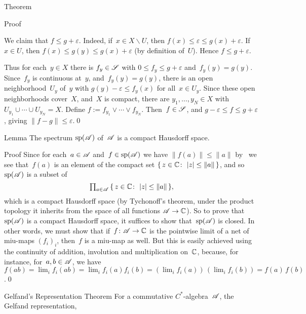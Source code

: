 \documentclass[a]{subfiles}
\begin{document}
\begin{parsec}
\begin{point}{Theorem}
\begin{point}{Proof}
\begin{point}
We claim that $f\leq g+\varepsilon$.
Indeed,
if~$x\in X\backslash U$,
then $f(x)\leq \varepsilon\leq g(x)+\varepsilon$.
If~$x\in U$,
then $f(x)\leq g(y)\leq g(x)+\varepsilon$
(by definition of~$U$).
Hence $f\leq g+\varepsilon$.
\end{point}
\begin{point}%
Thus for each~$y\in X$
there is $f_y\in \mathscr{S}$ with $0\leq f_y \leq g+\varepsilon$
and~$f_y(y)=g(y)$.
Since~$f_y$ is continuous at~$y$,
and~$f_y(y)=g(y)$,
there is an open neighborhood~$U_y$ of~$y$
with $g(y)-\varepsilon\leq f_y(x)$
for all~$x\in U_y$.
Since these open neighborhoods cover~$X$,
and~$X$ is compact,
there are $y_1,\dotsc,y_N\in X$
with $U_{y_1}\cup\dotsb\cup U_{y_N} = X$.
Define $f:=f_{y_1}\vee \dotsb\vee f_{y_N}$.
Then~$f\in\mathscr{S}$,
and $g-\varepsilon \leq f\leq g+\varepsilon$,
giving $\|f-g\|\leq \varepsilon$.\qed
\end{point}
\end{point}
\end{point}
\begin{point}{Lemma}%
The spectrum $\mathrm{sp}(\mathscr{A})$ of~$\mathscr{A}$ is a compact Hausdorff space.
\begin{point}{Proof}%
Since for each~$a\in \mathscr{A}$
and~$f\in \mathrm{sp}(\mathscr{A})$
we have  $\|f(a)\|\leq \|a\|$ 
by~
we see that~$f(a)$ is an element of the compact set
$\{\,z\in \mathbb{C}\colon\, \left|z\right|\leq\|a\|\,\}$,
and so~$\mathrm{sp}(\mathscr{A})$ is a subset of
\begin{equation*}
\textstyle
\prod_{a\in \mathscr{A}}\, \{\,z\in \mathbb{C}\colon\, \left|z\right|\leq \|a\|\,\},
\end{equation*}
which is a compact Hausdorff space
(by Tychonoff's theorem, under the product topology
it inherits
from the space of all functions $\mathscr{A}\to \mathbb{C}$).
So to prove that~$\mathrm{sp}(\mathscr{A})$
is a compact Hausdorff space,
it suffices to show that~$\mathrm{sp}(\mathscr{A})$
is closed.
In other words,
we must show that if~$f\colon \mathscr{A}\to \mathbb{C}$
is the pointwise limit of a net of miu-maps $(f_i)_i$,
then~$f$ is a miu-map as well.
But this is easily achieved
using the continuity of addition, involution and multiplication on~$\mathbb{C}$,
because, for instance, 
for~$a,b\in\mathscr{A}$, we have $f(ab)
= \lim_i f_i(ab)=\lim_i f_i(a)f_i(b)
 = (\lim_i f_i(a))\,(\lim_i f_i(b))
= f(a) \,f(b)$.\qed
\end{point}
\end{point}
\begin{point}[gelfand]{Gelfand's Representation Theorem}%
For a commutative $C^*$-algebra~$\mathscr{A}$,
the Gelfand representation, 

\end{point}
\end{parsec}
\end{document}
